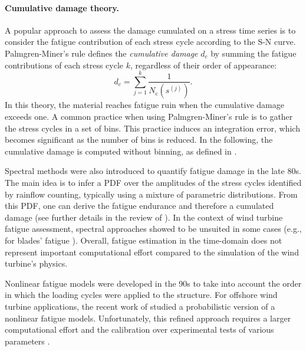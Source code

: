 \paragraph{Cumulative damage theory.}
A popular approach to assess the damage cumulated on a stress time series is to consider the fatigue contribution of each stress cycle according to the S-N curve. 
Palmgren-Miner's rule defines the \textit{cumulative damage} $d_c$ by summing the fatigue contributions of each stress cycle $k$, regardless of their order of appearance:
\begin{equation}
    d_c = \sum_{j=1}^{k} \frac{1}{N_{\mathrm{c}}\left(s^{(j)}\right)}.
    \label{eq:miner}
\end{equation}
In this theory, the material reaches fatigue ruin when the cumulative damage exceeds one.  
A common practice when using Palmgren-Miner's rule is to gather the stress cycles in a set of bins. 
This practice induces an integration error, which becomes significant as the number of bins is reduced. 
In the following, the cumulative damage is computed without binning, as defined in .


Spectral methods were also introduced to quantify fatigue damage in the late 80s. 
The main idea is to infer a PDF over the amplitudes of the stress cycles identified by rainflow counting, typically using a mixture of parametric distributions. 
From this PDF, one can derive the fatigue endurance and therefore a cumulated damage (see further details in the review of \citealt{dirlik_2021}). 
In the context of wind turbine fatigue assessment, spectral approaches showed to be unsuited in some cases (e.g., for blades' fatigue \citealt{ragan_2007_dirlik_vs_miner}).  
Overall, fatigue estimation in the time-domain does not represent important computational effort compared to the simulation of the wind turbine's physics. 

Nonlinear fatigue models were developed in the 90s \citep{fatemi_1998} to take into account the order in which the loading cycles were applied to the structure. 
For offshore wind turbine applications, the recent work of \citet{rocher_2020_nonlinear_fatigue} studied a probabilistic version of a nonlinear fatigue models. 
Unfortunately, this refined approach requires a larger computational effort and the calibration over experimental tests of various parameters \citep{freyssinet_2023_nonlinear_fatigue}.  


